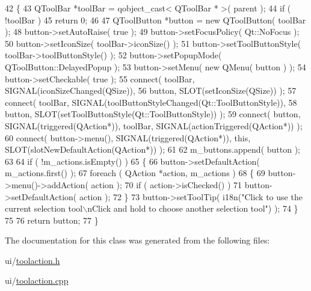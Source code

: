 \begin{DoxyCode}
42 \{
43     QToolBar *toolBar = qobject\_cast< QToolBar * >( parent );
44     \textcolor{keywordflow}{if} ( !toolBar )
45         \textcolor{keywordflow}{return} 0;
46 
47     QToolButton *button = \textcolor{keyword}{new} QToolButton( toolBar );
48     button->setAutoRaise( \textcolor{keyword}{true} );
49     button->setFocusPolicy( Qt::NoFocus );
50     button->setIconSize( toolBar->iconSize() );
51     button->setToolButtonStyle( toolBar->toolButtonStyle() );
52     button->setPopupMode( QToolButton::DelayedPopup );
53     button->setMenu( \textcolor{keyword}{new} QMenu( button ) );
54     button->setCheckable( \textcolor{keyword}{true} );
55     connect( toolBar, SIGNAL(iconSizeChanged(QSize)),
56              button, SLOT(setIconSize(QSize)) );
57     connect( toolBar, SIGNAL(toolButtonStyleChanged(Qt::ToolButtonStyle)),
58              button, SLOT(setToolButtonStyle(Qt::ToolButtonStyle)) );
59     connect( button, SIGNAL(triggered(QAction*)), toolBar, SIGNAL(actionTriggered(QAction*)) );
60     connect( button->menu(), SIGNAL(triggered(QAction*)), \textcolor{keyword}{this}, SLOT(slotNewDefaultAction(QAction*)) );
61 
62     m\_buttons.append( button );
63 
64     \textcolor{keywordflow}{if} ( !m\_actions.isEmpty() )
65     \{
66         button->setDefaultAction( m\_actions.first() );
67         \textcolor{keywordflow}{foreach} ( QAction *action, m\_actions )
68         \{
69             button->menu()->addAction( action );
70             \textcolor{keywordflow}{if} ( action->isChecked() )
71                 button->setDefaultAction( action );
72         \}
73         button->setToolTip( i18n(\textcolor{stringliteral}{"Click to use the current selection tool\(\backslash\)nClick and hold to choose another
       selection tool"}) );
74     \}
75 
76     \textcolor{keywordflow}{return} button;
77 \}
\end{DoxyCode}


The documentation for this class was generated from the following files\+:\begin{DoxyCompactItemize}
\item 
ui/\hyperlink{toolaction_8h}{toolaction.\+h}\item 
ui/\hyperlink{toolaction_8cpp}{toolaction.\+cpp}\end{DoxyCompactItemize}
